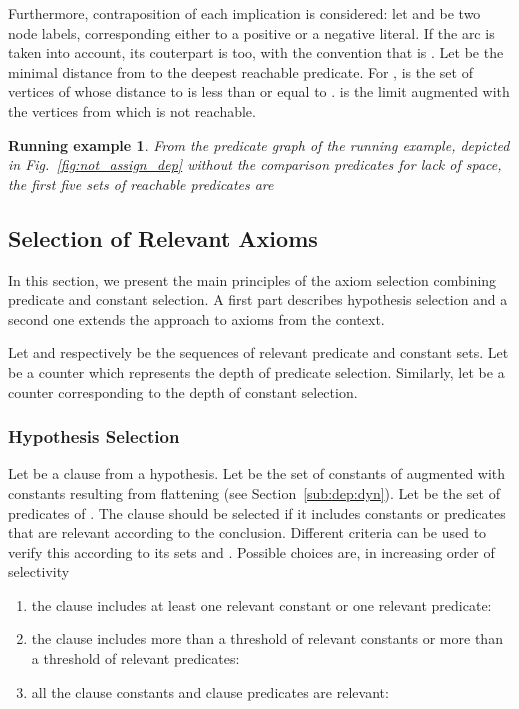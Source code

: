 \documentclass{acm_proc_article-sp}
\theoremstyle{nonumberplain}
\newtheorem{xpl}{Running example}}
\begin{document}
Furthermore, contraposition of each implication is considered: 
let   and  be two node labels, corresponding either
to a positive or a negative literal.
If the arc  is taken into account, 
its couterpart  is too,
with the convention that  is .
Let  be the minimal distance from  to the deepest 
reachable predicate. For ,  is the set of 
vertices of  whose distance to  is less than or equal 
to .  is the
limit  
augmented with the vertices from which  is not reachable.  


\begin{xpl}
From the predicate graph of the running example, depicted in
Fig.~\ref{fig:not_assign_dep} without the comparison predicates for
lack of space, the first five sets of reachable predicates are

\end{xpl}


\subsection{Selection of Relevant Axioms}\label{sub:hyp:sel}
In this section, we present the main principles of the axiom selection
combining predicate and constant selection. A first part describes
hypothesis selection and a second one extends the approach to axioms
from the context.
 
Let  and 
respectively be the sequences of relevant predicate and constant sets.
Let  be a counter which represents the depth of predicate selection.
Similarly, let  be a counter corresponding to the depth of constant
selection.




\subsubsection{Hypothesis Selection}
Let  be a clause from a hypothesis.
Let  be the set of constants of  augmented with 
constants resulting from flattening (see Section~\ref{sub:dep:dyn}). 
Let  be the set of predicates of .
The clause  should be selected if 
it includes constants or predicates that are relevant according 
to the conclusion.
Different criteria can be used to verify this 
according to its sets  and .
Possible choices are, in increasing order of selectivity 
\begin{enumerate}
\item  
 the clause includes at least one relevant constant or one
 relevant predicate: 
 
\centerline{}



\item \label{item:stat} 
 the clause includes more than a threshold  of relevant
 constants or  more than a threshold  of 
 relevant predicates: \vspace*{3pt}

\centerline{}
     

\item \label{item:include} 
  all the clause constants and clause predicates are relevant:

\centerline{}

\end{enumerate}
\end{document}
